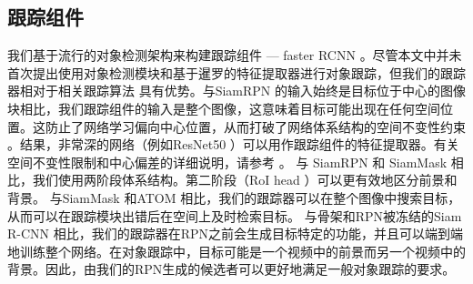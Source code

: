 \subsection{跟踪组件}

我们基于流行的对象检测架构来构建跟踪组件 --- faster RCNN \cite{ren2015faster}。尽管本文中并未首次提出使用对象检测模块和基于暹罗的特征提取器进行对象跟踪，但我们的跟踪器相对于相关跟踪算法 \cite{SiamRPN, Wang2018SiamMask, danelljan2019atom, voigtlaender2019siam}具有优势。与SiamRPN \cite{SiamRPN}的输入始终是目标位于中心的图像块相比，我们跟踪组件的输入是整个图像，这意味着目标可能出现在任何空间位置。这防止了网络学习偏向中心位置，从而打破了网络体系结构的空间不变性约束 \cite{SiamRPN++} 。结果，非常深的网络（例如ResNet50 \cite{he2016deep}）可以用作跟踪组件的特征提取器。有关空间不变性限制和中心偏差的详细说明，请参考 \cite{SiamRPN++}。
与 SiamRPN \cite{SiamRPN} 和 SiamMask \cite{Wang2018SiamMask} 相比，我们使用两阶段体系结构。第二阶段（RoI head \cite{ren2015faster}）可以更有效地区分前景和背景。
与SiamMask \cite{Wang2018SiamMask} 和ATOM \cite{danelljan2019atom}相比，我们的跟踪器可以在整个图像中搜索目标，从而可以在跟踪模块出错后在空间上及时检索目标。
与骨架和RPN被冻结的Siam R-CNN \cite{voigtlaender2019siam}相比，我们的跟踪器在RPN之前会生成目标特定的功能，并且可以端到端地训练整个网络。在对象跟踪中，目标可能是一个视频中的前景而另一个视频中的背景。因此，由我们的RPN生成的候选者可以更好地满足一般对象跟踪的要求。

